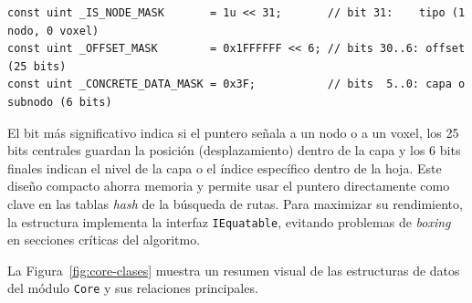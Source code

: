 \begin{lstlisting}[language={[Sharp]C}]
const uint _IS_NODE_MASK       = 1u << 31;       // bit 31:    tipo (1 nodo, 0 voxel)
const uint _OFFSET_MASK        = 0x1FFFFFF << 6; // bits 30..6: offset (25 bits)
const uint _CONCRETE_DATA_MASK = 0x3F;           // bits  5..0: capa o subnodo (6 bits)
\end{lstlisting}

El bit más significativo indica si el puntero señala a un nodo o a un \gls{voxel}, los 25 bits centrales guardan la posición (desplazamiento) dentro de la capa y los 6 bits finales indican el nivel de la capa o el índice específico dentro de la hoja.
Este diseño compacto ahorra memoria y permite usar el puntero directamente como clave en las tablas \textit{hash} de la búsqueda de rutas.
Para maximizar su rendimiento, la estructura implementa la interfaz \texttt{IEquatable}, evitando problemas de \textit{boxing} en secciones críticas del algoritmo.

La Figura~\ref{fig:core-clases} muestra un resumen visual de las estructuras de datos del módulo \texttt{Core} y sus relaciones principales.

